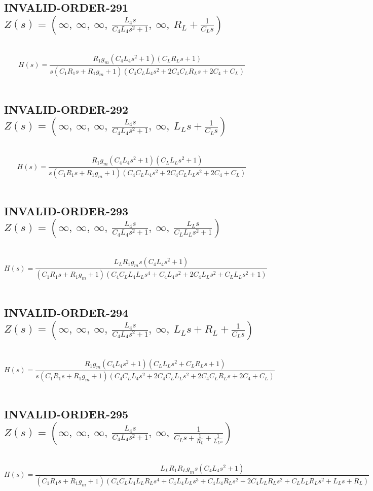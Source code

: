 \documentclass{article}
\begin{document}
\subsection{INVALID-ORDER-291 $Z(s) = \left( \infty, \  \infty, \  \infty, \  \frac{L_{4} s}{C_{4} L_{4} s^{2} + 1}, \  \infty, \  R_{L} + \frac{1}{C_{L} s}\right)$ } \ 
\textbf{\[H(s) = \frac{R_{1} g_{m} \left(C_{4} L_{4} s^{2} + 1\right) \left(C_{L} R_{L} s + 1\right)}{s \left(C_{1} R_{1} s + R_{1} g_{m} + 1\right) \left(C_{4} C_{L} L_{4} s^{2} + 2 C_{4} C_{L} R_{L} s + 2 C_{4} + C_{L}\right)}\] } \ 
\subsection{INVALID-ORDER-292 $Z(s) = \left( \infty, \  \infty, \  \infty, \  \frac{L_{4} s}{C_{4} L_{4} s^{2} + 1}, \  \infty, \  L_{L} s + \frac{1}{C_{L} s}\right)$ } \ 
\textbf{\[H(s) = \frac{R_{1} g_{m} \left(C_{4} L_{4} s^{2} + 1\right) \left(C_{L} L_{L} s^{2} + 1\right)}{s \left(C_{1} R_{1} s + R_{1} g_{m} + 1\right) \left(C_{4} C_{L} L_{4} s^{2} + 2 C_{4} C_{L} L_{L} s^{2} + 2 C_{4} + C_{L}\right)}\] } \ 
\subsection{INVALID-ORDER-293 $Z(s) = \left( \infty, \  \infty, \  \infty, \  \frac{L_{4} s}{C_{4} L_{4} s^{2} + 1}, \  \infty, \  \frac{L_{L} s}{C_{L} L_{L} s^{2} + 1}\right)$ } \ 
\textbf{\[H(s) = \frac{L_{L} R_{1} g_{m} s \left(C_{4} L_{4} s^{2} + 1\right)}{\left(C_{1} R_{1} s + R_{1} g_{m} + 1\right) \left(C_{4} C_{L} L_{4} L_{L} s^{4} + C_{4} L_{4} s^{2} + 2 C_{4} L_{L} s^{2} + C_{L} L_{L} s^{2} + 1\right)}\] } \ 
\subsection{INVALID-ORDER-294 $Z(s) = \left( \infty, \  \infty, \  \infty, \  \frac{L_{4} s}{C_{4} L_{4} s^{2} + 1}, \  \infty, \  L_{L} s + R_{L} + \frac{1}{C_{L} s}\right)$ } \ 
\textbf{\[H(s) = \frac{R_{1} g_{m} \left(C_{4} L_{4} s^{2} + 1\right) \left(C_{L} L_{L} s^{2} + C_{L} R_{L} s + 1\right)}{s \left(C_{1} R_{1} s + R_{1} g_{m} + 1\right) \left(C_{4} C_{L} L_{4} s^{2} + 2 C_{4} C_{L} L_{L} s^{2} + 2 C_{4} C_{L} R_{L} s + 2 C_{4} + C_{L}\right)}\] } \ 
\subsection{INVALID-ORDER-295 $Z(s) = \left( \infty, \  \infty, \  \infty, \  \frac{L_{4} s}{C_{4} L_{4} s^{2} + 1}, \  \infty, \  \frac{1}{C_{L} s + \frac{1}{R_{L}} + \frac{1}{L_{L} s}}\right)$ } \ 
\textbf{\[H(s) = \frac{L_{L} R_{1} R_{L} g_{m} s \left(C_{4} L_{4} s^{2} + 1\right)}{\left(C_{1} R_{1} s + R_{1} g_{m} + 1\right) \left(C_{4} C_{L} L_{4} L_{L} R_{L} s^{4} + C_{4} L_{4} L_{L} s^{3} + C_{4} L_{4} R_{L} s^{2} + 2 C_{4} L_{L} R_{L} s^{2} + C_{L} L_{L} R_{L} s^{2} + L_{L} s + R_{L}\right)}\] } \ 
\end{document}
